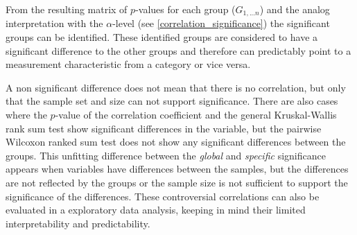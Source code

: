 From the resulting matrix of $p$-values for each group ($G_{1,...n}$) and the analog interpretation with the $\alpha$-level (see \cref{correlation_significance}) the significant groups can be identified. These identified groups are considered to have a significant difference to the other groups and therefore can predictably point to a measurement characteristic from a category or vice versa.

A non significant difference does not mean that there is no correlation, but only that the sample set and size can not support significance. There are also cases where the $p$-value of the correlation coefficient and the general Kruskal-Wallis rank sum test show significant differences in the variable, but the pairwise Wilcoxon ranked sum test does not show any significant differences between the groups. This unfitting difference between the \textit{global} and \textit{specific} significance appears when variables have differences between the samples, but the differences are not reflected by the groups or the sample size is not sufficient to support the significance of the differences. These controversial correlations can also be evaluated in a exploratory data analysis, keeping in mind their limited interpretability and predictability.

